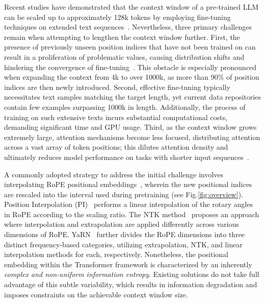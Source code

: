 Recent studies have demonstrated that the context window of a pre-trained LLM can be scaled up to approximately 128k tokens by employing fine-tuning techniques on extended text sequences~\cite{longlora,pi,yarn,zhang2024soaring,liu2023scaling}. Nevertheless, three primary challenges remain when attempting to lengthen the context window further. First, the presence of previously unseen position indices that have not been trained on can result in a proliferation of problematic values, causing distribution shifts and hindering the convergence of fine-tuning~\cite{pi}. This obstacle is especially pronounced when expanding the context from 4k to over 1000k, as more than 90\% of position indices are then newly introduced. Second, effective fine-tuning typically necessitates text samples matching the target length, yet current data repositories contain few examples surpassing 1000k in length. Additionally, the process of training on such extensive texts incurs substantial computational costs, demanding significant time and GPU usage. Third, as the context window grows extremely large, attention mechanisms become less focused, distributing attention across a vast array of token positions; this dilutes attention density and ultimately reduces model performance on tasks with shorter input sequences~\cite{pi}.

A commonly adopted strategy to address the initial challenge involves interpolating RoPE positional embeddings~\cite{rope,pi}, wherein the new positional indices are rescaled into the interval used during pretraining (see Fig.\ref{fig:overview}). Position Interpolation (PI)~\cite{pi} performs a linear interpolation of the rotary angles in RoPE according to the scaling ratio. The NTK method~\cite{ntk,dynamicntk} proposes an approach where interpolation and extrapolation are applied differently across various dimensions of RoPE. YaRN~\cite{yarn} further divides the RoPE dimensions into three distinct frequency-based categories, utilizing extrapolation, NTK, and linear interpolation methods for each, respectively. Nonetheless, the positional embedding within the Transformer framework is characterized by an inherently \emph{complex and non-uniform information entropy}. Existing solutions do not take full advantage of this subtle variability, which results in information degradation and imposes constraints on the achievable context window size.

